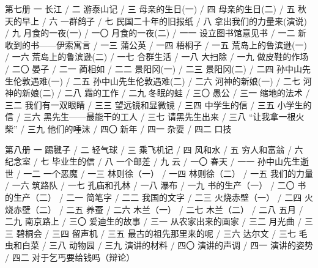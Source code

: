 第七册
一 长江 / 二 游泰山记 / 三 母亲的生日(一) / 四 母亲的生日(二) / 五 秋天的早上 / 六 一群鸽子 / 七 民国二十年的旧报纸 / 八 拿出我们的力量来(演说) / 九 月食的一夜(一) / 一〇 月食的一夜(二) / 一一 设立图书馆意见书 / 一二 新收到的书——伊索寓言 / 一三 蒲公英 / 一四 梧桐子 / 一五 荒岛上的鲁滨逊(一) / 一六 荒岛上的鲁滨逊(二) / 一七 合群生活 / 一八 大扫除 / 一九 做皮鞋的作场 / 二〇 晏子 / 二一 蔺相如 / 二二 景阳冈(一) / 二三 景阳冈(二) / 二四 孙中山先生伦敦遇难(一) / 二五 孙中山先生伦敦遇难(二) / 二六 河神的新娘(一) / 二七 河神的新娘(二) / 二八 霜的工作 / 二九 冬眠的蛙 / 三〇 愚公 / 三一 缩地的法术 / 三二 我们有一双眼睛 / 三三 望远镜和显微镜 / 三四 中学生的信 / 三五 小学生的信 / 三六 黑先生——最能干的工人 / 三七 请黑先生出来 / 三八 “让我拿一根火柴” / 三九 他们的唾沫 / 四〇 新年 / 四一 杂耍 / 四二 口技
 
第八册
一 踢毽子 / 二 轻气球 / 三 乘飞机记 / 四 风和水 / 五 穷人和富翁 / 六 纪念室 / 七 毕业生的信 / 八 一个邮差 / 九 云 / 一〇 春天 / 一一 孙中山先生逝世 / 一二 一个恶魔 / 一三 林则徐（一） / 一四 林则徐（二） / 一五 我们的力量 / 一六 筑路队 / 一七 孔庙和孔林 / 一八 瀑布 / 一九 书的生产（一） / 二〇 书的生产（二） / 二一 简笔字 / 二二 我国的文字 / 二三 火烧赤壁（一） / 二四 火烧赤壁（二） / 二五 养蚕 / 二六 木兰（一） / 二七 木兰（二） / 二八 五月 / 二九 南京路上 / 三〇 爱迪生的故事 / 三一 从农家出来的画家 / 三二 月光曲 / 三三 碧桐会 / 三四 留声机 / 三五 最古的祖先那里来的呢 / 三六 达尔文 / 三七 毛虫和白菜 / 三八 动物园 / 三九 演讲的材料 / 四〇 演讲的声调 / 四一 演讲的姿势 / 四二 对于乞丐要给钱吗（辩论）